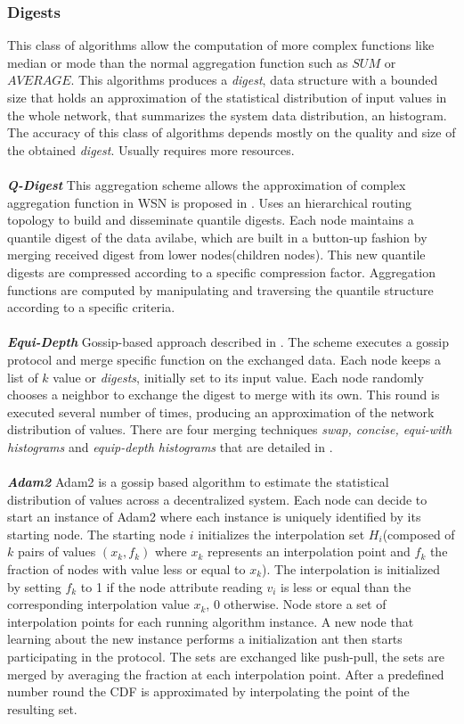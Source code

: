 \subsubsection{Digests}
This class of algorithms allow the computation of more complex functions like median or mode than the normal aggregation function such as $SUM$ or $AVERAGE$. This algorithms produces a \textit{digest}, data structure with a bounded size that holds an approximation of the statistical distribution of input values in the whole network, that summarizes the system data distribution, an histogram. The accuracy of this class of algorithms depends mostly on the quality and size of the obtained \textit{digest}. Usually requires more resources.\\
\\
\textbf{\textit{Q-Digest}} This aggregation scheme allows the approximation of complex aggregation function in WSN is proposed in \cite{shrivastava2004medians}. Uses an hierarchical routing topology to build and disseminate quantile digests. Each node maintains a quantile digest of the data avilabe, which are built in a button-up fashion by merging received digest from lower nodes(children nodes). This new quantile digests are compressed according to a specific compression factor. Aggregation functions are computed by manipulating and traversing the quantile structure according to a specific criteria.\\
\\
\textbf{\textit{Equi-Depth}} Gossip-based approach described in  \cite{horowitz2003estimating}. The scheme executes a  gossip protocol and merge specific function on the exchanged data. Each node keeps a list of $k$ value or \textit{digests}, initially set to its input value. Each node randomly chooses a neighbor to exchange the digest to merge with its own. This round is executed several number of times, producing an approximation of the network distribution of values. There are four merging techniques \textit{swap, concise, equi-with histograms} and \textit{equip-depth histograms} that are detailed in \cite{journals/corr/abs-1110-0725}.\\ 
\\
\textbf{\textit{Adam2}}
Adam2 is a gossip based algorithm to estimate the statistical distribution of values across a decentralized system\cite{sacha2010adam2}. Each node can decide to start an instance of Adam2 where each instance is uniquely identified by its starting node. The starting node $i$ initializes the interpolation set $H_i$(composed of $k$ pairs of values $(x_k,f_k)$ where $x_k$ represents an interpolation point and $f_k$ the fraction of nodes with value less or equal to $x_k$). The interpolation is initialized by setting $f_k$ to 1 if the node attribute reading $v_i$ is less or equal than the corresponding interpolation value $x_k$, 0 otherwise. Node store a set of interpolation points for each running algorithm instance.  A new node that learning about the new instance performs a initialization ant then starts participating in the protocol. The sets are exchanged like push-pull, the sets are merged by averaging the fraction at each interpolation point. After a predefined number round the CDF is approximated by interpolating the point of the resulting set.
